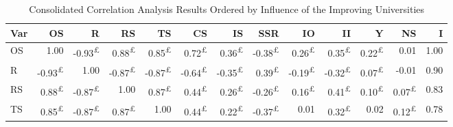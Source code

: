 \documentclass{singlecol-new}
\theoremstyle{TH}{
\newtheorem{lemma}{Lemma}
\newtheorem{theorem}[lemma]{Theorem}
\newtheorem{corrolary}[lemma]{Corrolary}
\newtheorem{conjecture}[lemma]{Conjecture}
\newtheorem{proposition}[lemma]{Proposition}
\newtheorem{claim}[lemma]{Claim}
\newtheorem{stheorem}[lemma]{Wrong Theorem}
\newtheorem{algorithm}{Algorithm}
}
\theoremstyle{THrm}{
\newtheorem{definition}{Definition}[section]
\newtheorem{question}{Question}[section]
\newtheorem{remark}{Remark}
\newtheorem{scheme}{Scheme}
}
\theoremstyle{THhit}{
\newtheorem{case}{Case}[section]
}
\begin{document}
\begin{table*}[h!]
	\centering
	\caption{Consolidated Correlation Analysis Results Ordered by Influence of the Improving Universities}
	\label{tab:correlation_improving}
	\scriptsize
	\begin{tabular}{|l|r|r|r|r|r|r|r|r|r|r|r|r|}
		\hline
		\textbf{Var} & \textbf{OS} & \textbf{R} & \textbf{RS} & \textbf{TS} & \textbf{CS} & \textbf{IS} & \textbf{SSR} & \textbf{IO} & \textbf{II} & \textbf{Y} & \textbf{NS} & \textbf{I} \\ \hline
		
		OS & \cellcolor{gray!50}1.00 & \cellcolor{gray!46}-0.93\textsuperscript{£} & \cellcolor{gray!44}0.88\textsuperscript{£} & \cellcolor{gray!42}0.85\textsuperscript{£} & \cellcolor{gray!36}0.72\textsuperscript{£} & \cellcolor{gray!18}0.36\textsuperscript{£} & \cellcolor{gray!19}-0.38\textsuperscript{£} & \cellcolor{gray!13}0.26\textsuperscript{£} & \cellcolor{gray!17}0.35\textsuperscript{£} & \cellcolor{gray!11}0.22\textsuperscript{£} & \cellcolor{gray!0}0.01 & 1.00 \\ \hline
		
		R & \cellcolor{gray!46}-0.93\textsuperscript{£} & \cellcolor{gray!50}1.00 & \cellcolor{gray!43}-0.87\textsuperscript{£} & \cellcolor{gray!43}-0.87\textsuperscript{£} & \cellcolor{gray!32}-0.64\textsuperscript{£} & \cellcolor{gray!17}-0.35\textsuperscript{£} & \cellcolor{gray!19}0.39\textsuperscript{£} & \cellcolor{gray!9}-0.19\textsuperscript{£} & \cellcolor{gray!16}-0.32\textsuperscript{£} & \cellcolor{gray!3}0.07\textsuperscript{£} & \cellcolor{gray!0}-0.01 & 0.90 \\ \hline
		
		RS & \cellcolor{gray!44}0.88\textsuperscript{£} & \cellcolor{gray!43}-0.87\textsuperscript{£} & \cellcolor{gray!50}1.00 & \cellcolor{gray!43}0.87\textsuperscript{£} & \cellcolor{gray!22}0.44\textsuperscript{£} & \cellcolor{gray!13}0.26\textsuperscript{£} & \cellcolor{gray!13}-0.26\textsuperscript{£} & \cellcolor{gray!8}0.16\textsuperscript{£} & \cellcolor{gray!20}0.41\textsuperscript{£} & \cellcolor{gray!5}0.10\textsuperscript{£} & \cellcolor{gray!3}0.07\textsuperscript{£} & 0.83 \\ \hline
		
		TS & \cellcolor{gray!42}0.85\textsuperscript{£} & \cellcolor{gray!43}-0.87\textsuperscript{£} & \cellcolor{gray!43}0.87\textsuperscript{£} & \cellcolor{gray!50}1.00 & \cellcolor{gray!22}0.44\textsuperscript{£} & \cellcolor{gray!11}0.22\textsuperscript{£} & \cellcolor{gray!18}-0.37\textsuperscript{£} & \cellcolor{gray!0}0.01 & \cellcolor{gray!16}0.32\textsuperscript{£} & \cellcolor{gray!1}0.02 & \cellcolor{gray!6}0.12\textsuperscript{£} & 0.78 \\ \hline
		

\end{tabular}
\end{table*}
\end{document}
